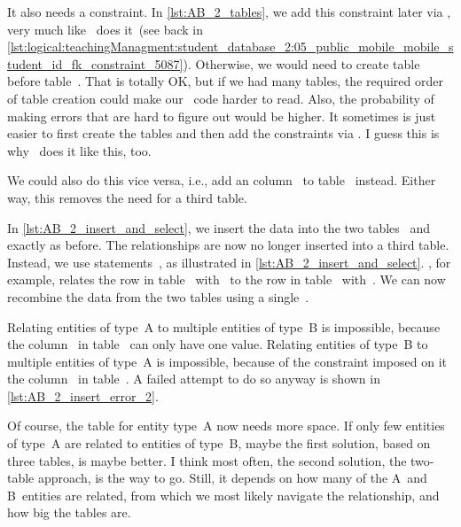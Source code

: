 It also needs a  constraint.
In \cref{lst:AB_2_tables}, we add this constraint later via , very much like \pgmodeler\ does it~(see back in \cref{lst:logical:teachingManagment:student_database_2:05_public_mobile_mobile_student_id_fk_constraint_5087}).
Otherwise, we would need to create table~ before table~.
That is totally OK, but if we had many tables, the required order of table creation could make our \sql\ code harder to read.
Also, the probability of making errors that are hard to figure out would be higher.
It sometimes is just easier to first create the tables and then add the constraints via .
I guess this is why \pgmodeler\ does it like this, too.

We could also do this vice versa, i.e., add an column~ to table~ instead.
Either way, this removes the need for a third table.

In \cref{lst:AB_2_insert_and_select}, we insert the data into the two tables~ and~ exactly as before.
The relationships are now no longer inserted into a third table.
Instead, we use  statements~\cite{PGDG:PD:U}, as illustrated in \cref{lst:AB_2_insert_and_select}.
, for example, relates the row in table~ with~ to the row in table~ with~.
We can now recombine the data from the two tables using a single~.

Relating entities of type~A to multiple entities of type~B is impossible, because the column~ in table~ can only have one value.
Relating entities of type~B to multiple entities of type~A is impossible, because of the  constraint imposed on it the column~ in table~.
A failed attempt to do so anyway is shown in \cref{lst:AB_2_insert_error_2}.

Of course, the table for entity type~A now needs more space.
If only few entities of type~A are related to entities of type~B, maybe the first solution, based on three tables, is maybe better.
I think most often, the second solution, the two-table approach, is the way to go.
Still, it depends on how many of the A~and B~entities are related, from which  we most likely navigate the relationship, and how big the tables are.%
%
\FloatBarrier%
\endhsection%
